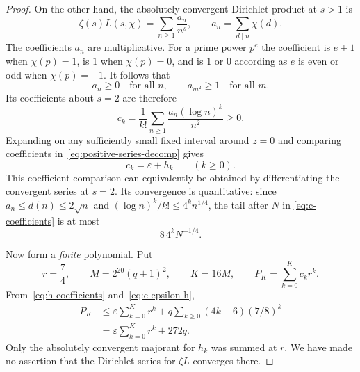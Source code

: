 \begin{proof}
On the other hand, the absolutely convergent Dirichlet product at $s>1$ is
\[
 \zeta(s)L(s,\chi)=\sum_{n\geq1}\frac{a_n}{n^s},
 \qquad a_n=\sum_{d\mid n}\chi(d).
\]
The coefficients $a_n$ are multiplicative.  For a prime power $p^e$ the
coefficient is $e+1$ when $\chi(p)=1$, is $1$ when $\chi(p)=0$, and is
$1$ or $0$ according as $e$ is even or odd when $\chi(p)=-1$.
It follows that
\begin{equation}
 a_n\geq0\quad\text{for all }n,\qquad a_{m^2}\geq1\quad\text{for all }m.
 \label{eq:positive-square-coefficients}
\end{equation}
Its coefficients about $s=2$ are therefore
\begin{equation}
 c_k=\frac1{k!}\sum_{n\geq1}\frac{a_n(\log n)^k}{n^2}\geq0.
 \label{eq:c-coefficients}
\end{equation}
Expanding on any sufficiently small fixed interval around $z=0$ and
comparing coefficients in~\eqref{eq:positive-series-decomp} gives
\begin{equation}
 c_k=\varepsilon+h_k\qquad(k\geq0).
 \label{eq:c-epsilon-h}
\end{equation}
This coefficient comparison can equivalently be obtained by differentiating
the convergent series at $s=2$.  Its convergence is quantitative: since
$a_n\leq d(n)\leq2\sqrt n$ and
$(\log n)^k/k!\leq4^k n^{1/4}$, the tail after $N$ in
\eqref{eq:c-coefficients} is at most
\begin{equation}
 8\,4^kN^{-1/4}.
 \label{eq:c-coefficient-tail}
\end{equation}

Now form a \emph{finite} polynomial.  Put
\[
 r=\frac74,\qquad M=2^{20}(q+1)^2,\qquad K=16M,
 \qquad P_K=\sum_{k=0}^K c_kr^k.
\]
From~\eqref{eq:h-coefficients} and~\eqref{eq:c-epsilon-h},
\begin{align}
 P_K
 &\leq\varepsilon\sum_{k=0}^K r^k
       +q\sum_{k\geq0}(4k+6)(7/8)^k\nonumber\\
 &=\varepsilon\sum_{k=0}^K r^k+272q.
 \label{eq:PK-upper}
\end{align}
Only the absolutely convergent majorant for $h_k$ was summed at $r$.
We have made no assertion that the Dirichlet series for $\zeta L$ converges
there.


\end{proof}
